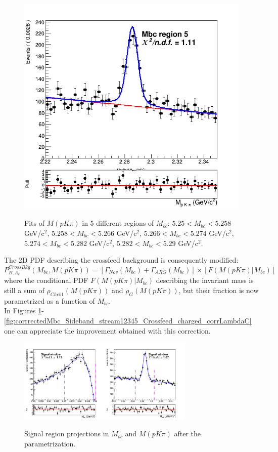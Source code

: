 \begin{figure}[H]
\subcaptionbox{\label{fig:CrossfeedMbcRegionsInvMpeak5}}
{\includegraphics[width=.4\textwidth]{04-chargedCorrBtoLambda/figs/region5_stream12345_Crossfeed_charged_corrLambdaC_2Dfit.png}}
\caption{Fits of $M(p K \pi)$ in 5 different regions of $M_{bc}$: $5.25 < M_{bc} < 5.258$ GeV/c$^2$, $5.258 < M_{bc} < 5.266$ GeV/c$^2$, $5.266 < M_{bc} < 5.274$ GeV/c$^2$, $5.274 < M_{bc} < 5.282$ GeV/c$^2$,  $5.282 < M_{bc} < 5.29$ GeV/c$^2$.}
\end{figure}

The 2D PDF describing the crossfeed background is consequently modified:\\
\begin{equation}\label{eq:paramCrossfeedPDF}
P^{CrossBkg}_{B,\Lambda_c}(M_{bc}, M(p K \pi)) = [\Gamma_{Nov}(M_{bc}) + \Gamma_{ARG}(M_{bc})] \times [F(M(p K \pi)|M_{bc})]
\end{equation}
where the conditional PDF $F(M(p K \pi)|M_{bc})$ describing the invariant mass is still a sum of $\rho_{Cheb1}(M(p K \pi))$ and $ \rho_{G}(M(p K \pi))$, but their fraction is now parametrized as a function of  $M_{bc}$.\\
In Figures \ref{fig:correctedSignal_window_Crossfeed_charged_corrLambdaC}- \ref{fig:corrrectedMbc_Sideband_stream12345_Crossfeed_charged_corrLambdaC} one can appreciate the improvement obtained with this correction.  

\begin{figure}[h!]
%
{\includegraphics[width=0.75\textwidth]{04-chargedCorrBtoLambda/figs/Signal_window_stream12345_Crossfeed_charged_corrLambdaC_2Dfit_afterParametrization.png}}
\caption{Signal region projections in $M_{bc}$ and $M(p K \pi)$ after the parametrization. }
\label{fig:correctedSignal_window_Crossfeed_charged_corrLambdaC}
\end{figure}


